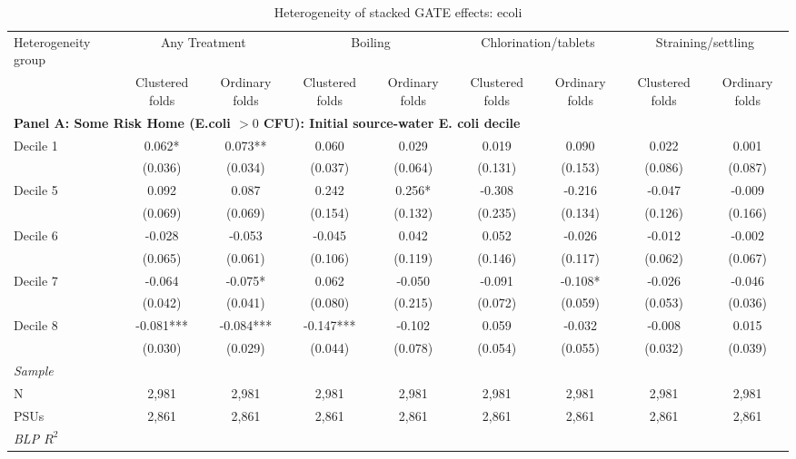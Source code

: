 \begin{landscape}
\begin{table}[p]
\centering
\caption{Heterogeneity of stacked GATE effects: ecoli}
\label{tab:table_gate_appendix-ecoli}
\scriptsize\setlength{\tabcolsep}{4pt}
\begin{adjustbox}{max width=\linewidth, center}
\begin{tabular}{lcccccccc}
\toprule
Heterogeneity group & \multicolumn{2}{c}{Any Treatment} & \multicolumn{2}{c}{Boiling} & \multicolumn{2}{c}{Chlorination/tablets} & \multicolumn{2}{c}{Straining/settling} \\
 & Clustered folds & Ordinary folds & Clustered folds & Ordinary folds & Clustered folds & Ordinary folds & Clustered folds & Ordinary folds \\
\midrule
\multicolumn{9}{l}{\textbf{Panel A: Some Risk Home (E.coli $>0$ CFU): Initial source-water E. coli decile}} \\
Decile 1 & 0.062* & 0.073** & 0.060 & 0.029 & 0.019 & 0.090 & 0.022 & 0.001 \\
 & (0.036) & (0.034) & (0.037) & (0.064) & (0.131) & (0.153) & (0.086) & (0.087) \\
Decile 5 & 0.092 & 0.087 & 0.242 & 0.256* & -0.308 & -0.216 & -0.047 & -0.009 \\
 & (0.069) & (0.069) & (0.154) & (0.132) & (0.235) & (0.134) & (0.126) & (0.166) \\
Decile 6 & -0.028 & -0.053 & -0.045 & 0.042 & 0.052 & -0.026 & -0.012 & -0.002 \\
 & (0.065) & (0.061) & (0.106) & (0.119) & (0.146) & (0.117) & (0.062) & (0.067) \\
Decile 7 & -0.064 & -0.075* & 0.062 & -0.050 & -0.091 & -0.108* & -0.026 & -0.046 \\
 & (0.042) & (0.041) & (0.080) & (0.215) & (0.072) & (0.059) & (0.053) & (0.036) \\
Decile 8 & -0.081*** & -0.084*** & -0.147*** & -0.102 & 0.059 & -0.032 & -0.008 & 0.015 \\
 & (0.030) & (0.029) & (0.044) & (0.078) & (0.054) & (0.055) & (0.032) & (0.039) \\
\multicolumn{9}{l}{\textit{Sample}} \\
\quad N & 2,981 & 2,981 & 2,981 & 2,981 & 2,981 & 2,981 & 2,981 & 2,981 \\
\quad PSUs & 2,861 & 2,861 & 2,861 & 2,861 & 2,861 & 2,861 & 2,861 & 2,861 \\
\multicolumn{9}{l}{\textit{BLP $R^{2}$}} \\

\end{tabular}
\end{adjustbox}
\end{table}
\end{landscape}
